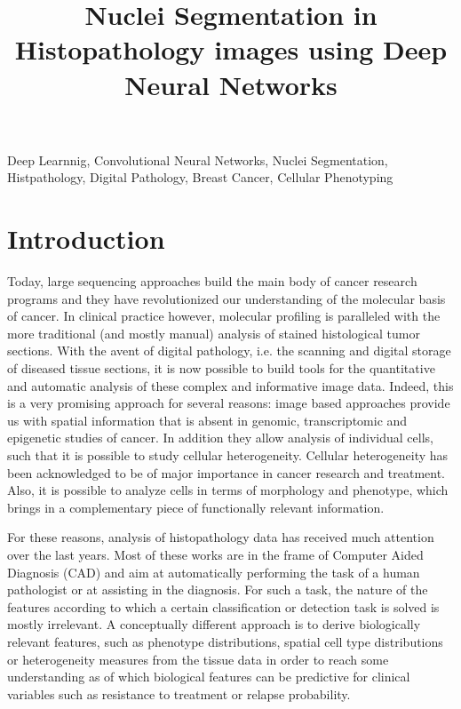 \documentclass{article}
\title{Nuclei Segmentation in Histopathology
  images using Deep Neural Networks}
\begin{document}
%
\maketitle
%
\begin{abstract}
\end{abstract}
%
\begin{keywords}
Deep Learnnig, Convolutional Neural Networks, Nuclei Segmentation,
Histpathology, Digital Pathology, Breast Cancer, Cellular Phenotyping
\end{keywords}
%
\section{Introduction}
\label{sec:intro}

\noindent Today, large sequencing approaches build the main body of cancer
research programs and they have revolutionized our understanding of
the molecular basis of cancer. In clinical practice however,
molecular profiling is paralleled with the more traditional
(and mostly manual) analysis of stained histological tumor
sections. With the avent of digital pathology, i.e. the scanning and
digital storage of diseased tissue sections, it is now possible to
build tools for the quantitative and automatic analysis of these
complex and informative image data. Indeed, this is a very promising
approach for several reasons: image based approaches
provide us with spatial information that is absent in genomic,
transcriptomic and epigenetic studies of cancer. In addition they
allow analysis of individual cells, such that it is possible to study
cellular heterogeneity. Cellular heterogeneity has been acknowledged
to be of major importance in cancer research and treatment. Also, it
is possible to analyze cells in terms of morphology and phenotype,
which brings in a complementary piece of functionally relevant
information.  

For these reasons, analysis of histopathology data has received much
attention over the last years. Most of these works are in the frame of
Computer Aided Diagnosis (CAD) and aim at automatically performing the
task of a human pathologist or at assisting in the diagnosis. For such
a task, the nature of the features according to which a certain
classification or detection task is solved is mostly
irrelevant. A conceptually different approach is to derive biologically
relevant features, such as phenotype distributions, spatial cell type
distributions or heterogeneity measures from the tissue data in order to reach some
understanding as of which biological features can be predictive for
clinical variables such as resistance to treatment or relapse
probability. 
\end{document}
